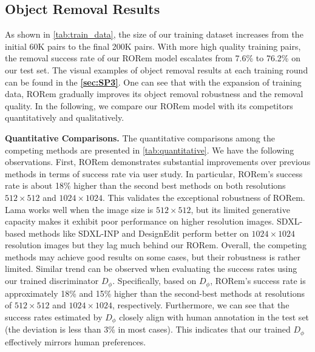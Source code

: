 \documentclass[10pt,twocolumn,letterpaper]{article}
\begin{document}
\subsection{Object Removal Results}
\label{sec:4-2}
As shown in \cref{tab:train_data}, the size of our training dataset increases from the initial 60K pairs to the final 200K pairs. With more high quality training pairs, the removal success rate of our RORem model escalates from 7.6\% to 76.2\% on our test set. The visual examples of object removal results at each training round can be found in the \textbf{\cref{sec:SP3}}. One can see that with the expansion of training data, RORem gradually improves its object removal robustness and the removal quality. In the following, we compare our RORem model with its competitors quantitatively and qualitatively.

\noindent\textbf{Quantitative Comparisons.} The quantitative comparisons among the competing methods are presented in \cref{tab:quantitative}. We have the following observations. First, RORem demonstrates substantial improvements over previous methods in terms of success rate via user study. In particular, RORem's success rate is about 18\% higher than the second best methods on both resolutions $512 \times 512$ and $1024 \times 1024$. This validates the exceptional robustness of RORem. Lama works well when the image size is $512 \times 512$, but its limited generative capacity makes it exhibit poor performance on higher resolution images. SDXL-based methods like SDXL-INP and DesignEdit perform better on $1024 \times 1024$ resolution images but they lag much behind our RORem. Overall, the competing methods may achieve good results on some cases, but their robustness is rather limited. Similar trend can be observed when evaluating the success rates using our trained discriminator $D_{\phi}$. Specifically, based on $D_{\phi}$, RORem's success rate is approximately 18\% and 15\% higher than the second-best methods at resolutions of $512 \times 512$ and $1024 \times 1024$, respectively. Furthermore, we can see that the success rates estimated by $D_{\phi}$ closely align with human annotation in the test set (the deviation is less than 3\% in most cases). This indicates that our trained $ D_{\phi} $ effectively mirrors human preferences.
\end{document}
